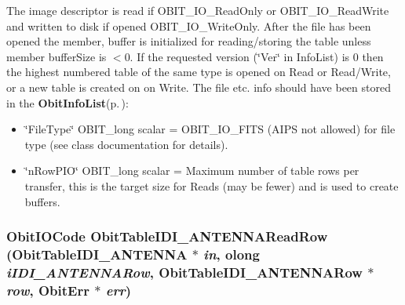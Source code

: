 The image descriptor is read if OBIT\_\-IO\_\-Read\-Only or OBIT\_\-IO\_\-Read\-Write and written to disk if opened OBIT\_\-IO\_\-Write\-Only. After the file has been opened the member, buffer is initialized for reading/storing the table unless member buffer\-Size is $<$0. If the requested version (\char`\"{}Ver\char`\"{} in Info\-List) is 0 then the highest numbered table of the same type is opened on Read or Read/Write, or a new table is created on on Write. The file etc. info should have been stored in the {\bf Obit\-Info\-List}{\rm (p.\,\pageref{structObitInfoList})}: \begin{itemize}
\item \char`\"{}File\-Type\char`\"{} OBIT\_\-long scalar = OBIT\_\-IO\_\-FITS (AIPS not allowed) for file type (see class documentation for details). \item \char`\"{}n\-Row\-PIO\char`\"{} OBIT\_\-long scalar = Maximum number of table rows per transfer, this is the target size for Reads (may be fewer) and is used to create buffers. 
\end{itemize}
\subsubsection{\setlength{\rightskip}{0pt plus 5cm}Obit\-IOCode Obit\-Table\-IDI\_\-ANTENNARead\-Row ({\bf Obit\-Table\-IDI\_\-ANTENNA} $\ast$ {\em in}, {\bf olong} {\em i\-IDI\_\-ANTENNARow}, {\bf Obit\-Table\-IDI\_\-ANTENNARow} $\ast$ {\em row}, {\bf Obit\-Err} $\ast$ {\em err})}\label{ObitTableIDI__ANTENNA_8c_a22}


